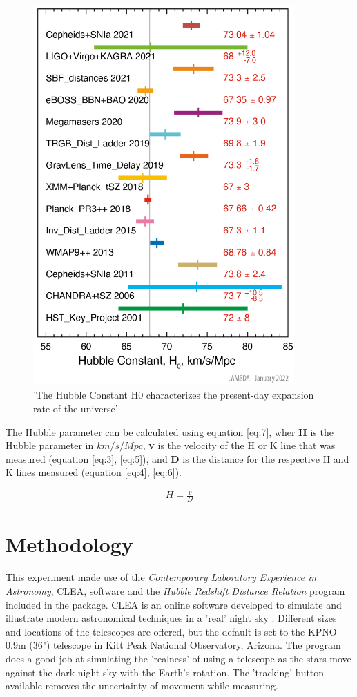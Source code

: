 \documentclass[12pt]{article}
\begin{document}
\begin{figure}[H]
    \centering
    \includegraphics[width=10cm]{hubble constant nasa.png}
    \caption{\centering \footnotesize{'The Hubble Constant H0 characterizes the present-day expansion rate of the universe' \protect\cite{nasahubble}}}
    \label{fig:hubble}
\end{figure}

The Hubble parameter can be calculated using equation \ref{eq:7}, wher \textbf{H} is the Hubble parameter in $km/s/Mpc$, \textbf{v} is the velocity
of the H or K line that was measured (equation \ref{eq:3}, \ref{eq:5}), and \textbf{D} is the distance for the respective H and K lines measured (equation \ref{eq:4}, \ref{eq:6}).

\begin{gather} \label{eq:7}
    H = \frac{v}{D}
\end{gather}

\section{Methodology} 

This experiment made use of the \textit{Contemporary Laboratory Experience in Astronomy}, CLEA, software and the \textit{Hubble Redshift Distance Relation} program included in the package.
CLEA is an online software developed to simulate and illustrate modern astronomical techniques in a 'real' night sky
\cite{clea}.
Different sizes and locations of the telescopes are offered, but the default is set to the KPNO 0.9m (36") telescope in Kitt Peak National Observatory, Arizona.
The program does a good job at simulating the 'realness' of using a telescope as the stars move against the dark night sky with the Earth's rotation. The 'tracking'
button available removes the uncertainty of movement while measuring.
\end{document}
